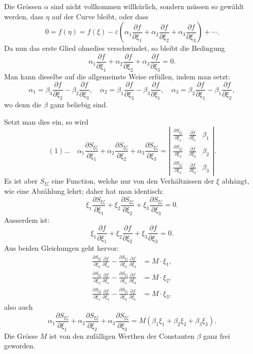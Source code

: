 \documentclass[10pt]{article}
\begin{document}
Die Grössen $\alpha$ sind nicht vollkommen willkürlich, sondern müssen so gewählt werden, dass $\eta$ auf der Curve bleibt, oder dass
\[
0=f(\eta)=f(\xi)-\varepsilon\left(\alpha_1\frac{\partial f}{\partial \xi_1}+\alpha_2\frac{\partial f}{\partial \xi_2}+\alpha_3\frac{\partial f}{\partial \xi_3}\right)+\cdots .
\]
Da nun das erste Glied ohnedies verschwindet, so bleibt die Bedingung
\[
\alpha_1\frac{\partial f}{\partial \xi_1}+\alpha_2\frac{\partial f}{\partial \xi_2}+\alpha_3\frac{\partial f}{\partial \xi_3}=0.
\]
Man kann dieselbe auf die allgemeinste Weise erfüllen, indem man setzt:
\[
\alpha_1=\beta_3\frac{\partial f}{\partial \xi_2}-\beta_2\frac{\partial f}{\partial \xi_3},
\quad
\alpha_2=\beta_1\frac{\partial f}{\partial \xi_3}-\beta_3\frac{\partial f}{\partial \xi_1},
\quad
\alpha_3=\beta_2\frac{\partial f}{\partial \xi_1}-\beta_1\frac{\partial f}{\partial \xi_2},
\]
wo denn die $\beta$ ganz beliebig sind.

Setzt man dies ein, so wird
\[
(1)\ldots\quad
\alpha_1\frac{\partial S_{\xi\zeta}}{\partial \xi_1}+\alpha_2\frac{\partial S_{\xi\zeta}}{\partial \xi_2}+\alpha_3\frac{\partial S_{\xi\zeta}}{\partial \xi_3}
=\left|
\begin{array}{ccc}
\frac{\partial S_{\xi\zeta}}{\partial \xi_1}&\frac{\partial f}{\partial \xi_1}&\beta_1\\
\frac{\partial S_{\xi\zeta}}{\partial \xi_2}&\frac{\partial f}{\partial \xi_2}&\beta_2\\
\frac{\partial S_{\xi\zeta}}{\partial \xi_3}&\frac{\partial f}{\partial \xi_3}&\beta_3
\end{array}
\right|.
\]
Es ist aber $S_{\xi\zeta}$ eine Function, welche nur von den Verhältnissen der $\xi$ abhängt, wie eine Abzählung lehrt; daher hat man identisch:
\[
\xi_1\frac{\partial S_{\xi\zeta}}{\partial \xi_1}+\xi_2\frac{\partial S_{\xi\zeta}}{\partial \xi_2}+\xi_3\frac{\partial S_{\xi\zeta}}{\partial \xi_3}=0.
\]
Ausserdem ist:
\[
\xi_1\frac{\partial f}{\partial \xi_1}+\xi_2\frac{\partial f}{\partial \xi_2}+\xi_3\frac{\partial f}{\partial \xi_3}=0.
\]
Aus beiden Gleichungen geht hervor:
\[
\begin{aligned}
\frac{\partial S_{\xi\zeta}}{\partial \xi_2}\frac{\partial f}{\partial \xi_3}
-\frac{\partial S_{\xi\zeta}}{\partial \xi_3}\frac{\partial f}{\partial \xi_2}&=M\cdot\xi_1,\\
\frac{\partial S_{\xi\zeta}}{\partial \xi_3}\frac{\partial f}{\partial \xi_1}
-\frac{\partial S_{\xi\zeta}}{\partial \xi_1}\frac{\partial f}{\partial \xi_3}&=M\cdot\xi_2,\\
\frac{\partial S_{\xi\zeta}}{\partial \xi_1}\frac{\partial f}{\partial \xi_2}
-\frac{\partial S_{\xi\zeta}}{\partial \xi_2}\frac{\partial f}{\partial \xi_1}&=M\cdot\xi_3,
\end{aligned}
\]
also auch
\[
\alpha_1\frac{\partial S_{\xi\zeta}}{\partial \xi_1}
+\alpha_2\frac{\partial S_{\xi\zeta}}{\partial \xi_2}
+\alpha_3\frac{\partial S_{\xi\zeta}}{\partial \xi_3}
=M(\beta_1\xi_1+\beta_2\xi_2+\beta_3\xi_3).
\]
Die Grösse $M$ ist von den zufälligen Werthen der Constanten $\beta$ ganz frei geworden.
\end{document}
